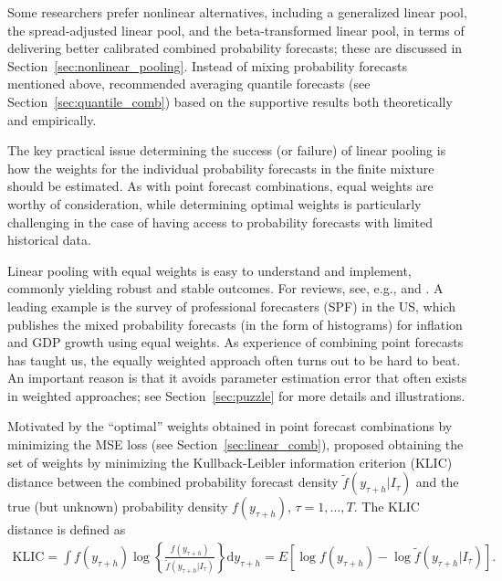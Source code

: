 \documentclass[a4paper,11pt]{article}
\begin{document}
Some researchers prefer nonlinear alternatives, including a generalized linear pool, the spread-adjusted linear pool, and the beta-transformed linear pool, in terms of delivering better calibrated combined probability forecasts; these are discussed in Section~\ref{sec:nonlinear_pooling}. Instead of mixing probability forecasts mentioned above, \citet{Lichtendahl2013-rt} recommended averaging quantile forecasts (see Section~\ref{sec:quantile_comb}) based on the supportive results both theoretically and empirically.

The key practical issue determining the success (or failure) of linear pooling is how the weights for the individual probability forecasts in the finite mixture should be estimated. As with point forecast combinations, equal weights are worthy of consideration, while determining optimal weights is particularly challenging in the case of having access to probability forecasts with limited historical data.

Linear pooling with equal weights is easy to understand and implement, commonly yielding robust and stable outcomes. For reviews, see, e.g., \citet{Wallis2005-yf} and \citet{OHagan2006-jk}. A leading example is the survey of professional forecasters (SPF) in the US, which publishes the mixed probability forecasts (in the form of histograms) for inflation and GDP growth using equal weights. As experience of combining point forecasts has taught us, the equally weighted approach often turns out to be hard to beat. An important reason is that it avoids parameter estimation error that often exists in weighted approaches; see Section~\ref{sec:puzzle} for more details and illustrations.

Motivated by the ``optimal'' weights obtained in point forecast combinations by minimizing the MSE loss (see Section~\ref{sec:linear_comb}), \citet{Hall2007-lh} proposed obtaining the set of weights by minimizing the Kullback-Leibler information criterion (KLIC) distance between the combined probability forecast density $\tilde{f}(y_{\tau+h}|I_{\tau})$ and the true (but unknown) probability density $f(y_{\tau+h})$, $\tau=1,\dots,T$. The KLIC distance is defined as
\begin{align*}
  \mathrm{KLIC} = \int f(y_{\tau+h}) \log \left\{\frac{f(y_{\tau+h})}{\tilde{f}(y_{\tau+h}|I_{\tau})}\right\} \mathrm{d} y_{\tau+h}
                =E\left[\log f(y_{\tau+h})-\log \tilde{f}(y_{\tau+h}|I_{\tau})\right].
\end{align*}
\end{document}
